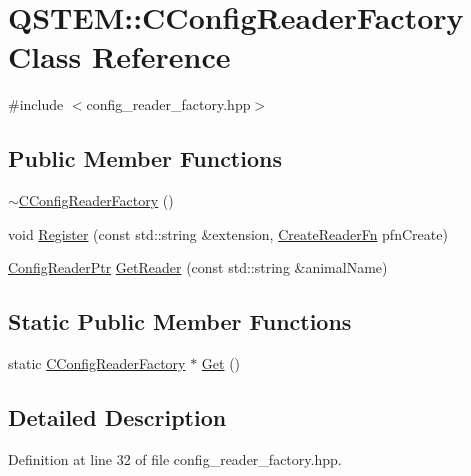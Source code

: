 \hypertarget{class_q_s_t_e_m_1_1_c_config_reader_factory}{\section{Q\-S\-T\-E\-M\-:\-:C\-Config\-Reader\-Factory Class Reference}
\label{class_q_s_t_e_m_1_1_c_config_reader_factory}
}


{\ttfamily \#include $<$config\-\_\-reader\-\_\-factory.\-hpp$>$}

\subsection*{Public Member Functions}
\begin{DoxyCompactItemize}
\item 
\hyperlink{class_q_s_t_e_m_1_1_c_config_reader_factory_a1a17e007aca60128ca2c96b364066177}{$\sim$\-C\-Config\-Reader\-Factory} ()
\item 
void \hyperlink{class_q_s_t_e_m_1_1_c_config_reader_factory_a2cfb90fc1fd82d2300e47c3a2246f47b}{Register} (const std\-::string \&extension, \hyperlink{namespace_q_s_t_e_m_afe36827e976fd231943b40ce85533524}{Create\-Reader\-Fn} pfn\-Create)
\item 
\hyperlink{namespace_q_s_t_e_m_af9424707fe9f6503298f49b41304bd35}{Config\-Reader\-Ptr} \hyperlink{class_q_s_t_e_m_1_1_c_config_reader_factory_a15ae8a099259a5993ac7f196412827d5}{Get\-Reader} (const std\-::string \&animal\-Name)
\end{DoxyCompactItemize}
\subsection*{Static Public Member Functions}
\begin{DoxyCompactItemize}
\item 
static \hyperlink{class_q_s_t_e_m_1_1_c_config_reader_factory}{C\-Config\-Reader\-Factory} $\ast$ \hyperlink{class_q_s_t_e_m_1_1_c_config_reader_factory_a806d3e802d03dca16d663e0134e541d7}{Get} ()
\end{DoxyCompactItemize}


\subsection{Detailed Description}


Definition at line 32 of file config\-\_\-reader\-\_\-factory.\-hpp.



